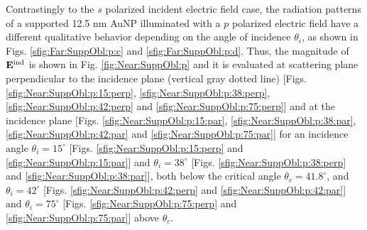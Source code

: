 Contrastingly to the $s$ polarized incident electric field case, the radiation patterns of a supported 12.5 nm AuNP illuminated with a $p$ polarized electric field have a different qualitative behavior depending on the angle of incidence $\theta_i$, as shown in Figs. \ref{sfig:Far:SuppObl:p:c} and  \ref{sfig:Far:SuppObl:p:d}. Thus, the magnitude of $\vb{E}^\text{ind}$ is shown in Fig. \ref{fig:Near:SuppObl:p} and it is evaluated at scattering plane perpendicular to the incidence plane (vertical gray dotted line) [Figs. \ref{sfig:Near:SuppObl:p:15:perp}, \ref{sfig:Near:SuppObl:p:38:perp}, \ref{sfig:Near:SuppObl:p:42:perp} and \ref{sfig:Near:SuppObl:p:75:perp}] and at the incidence  plane [Figs. \ref{sfig:Near:SuppObl:p:15:par}, \ref{sfig:Near:SuppObl:p:38:par}, \ref{sfig:Near:SuppObl:p:42:par} and \ref{sfig:Near:SuppObl:p:75:par}] for an incidence angle $\theta_i = 15^\circ$ [Figs. \ref{sfig:Near:SuppObl:p:15:perp}  and \ref{sfig:Near:SuppObl:p:15:par}] and  $\theta_i = 38^\circ$ [Figs. \ref{sfig:Near:SuppObl:p:38:perp}  and \ref{sfig:Near:SuppObl:p:38:par}], both below the critical angle $\theta_c = 41.8^\circ$, and $\theta_i = 42^\circ$ [Figs. \ref{sfig:Near:SuppObl:p:42:perp}  and \ref{sfig:Near:SuppObl:p:42:par}] and  $\theta_i = 75^\circ$ [Figs. \ref{sfig:Near:SuppObl:p:75:perp}  and \ref{sfig:Near:SuppObl:p:75:par}] above $\theta_c$.

